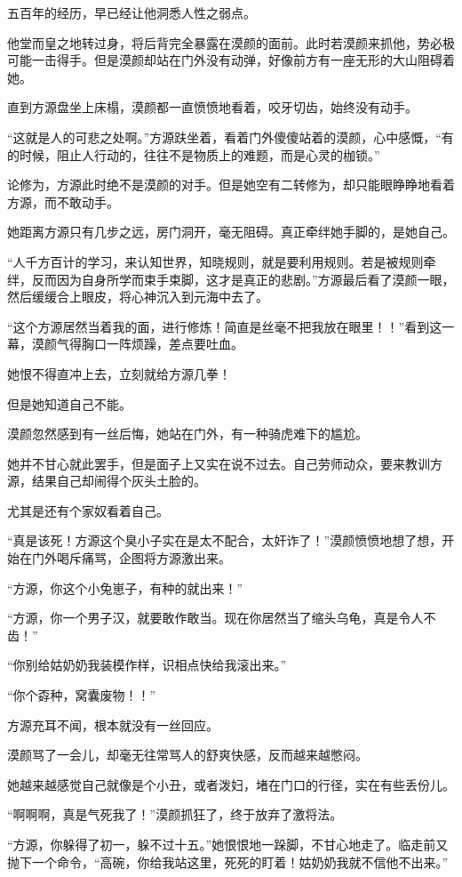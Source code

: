 \begin{this_body}
五百年的经历，早已经让他洞悉人性之弱点。

他堂而皇之地转过身，将后背完全暴露在漠颜的面前。此时若漠颜来抓他，势必极可能一击得手。但是漠颜却站在门外没有动弹，好像前方有一座无形的大山阻碍着她。

直到方源盘坐上床榻，漠颜都一直愤愤地看着，咬牙切齿，始终没有动手。

“这就是人的可悲之处啊。”方源趺坐着，看着门外傻傻站着的漠颜，心中感慨，“有的时候，阻止人行动的，往往不是物质上的难题，而是心灵的枷锁。”

论修为，方源此时绝不是漠颜的对手。但是她空有二转修为，却只能眼睁睁地看着方源，而不敢动手。

她距离方源只有几步之远，房门洞开，毫无阻碍。真正牵绊她手脚的，是她自己。

“人千方百计的学习，来认知世界，知晓规则，就是要利用规则。若是被规则牵绊，反而因为自身所学而束手束脚，这才是真正的悲剧。”方源最后看了漠颜一眼，然后缓缓合上眼皮，将心神沉入到元海中去了。

“这个方源居然当着我的面，进行修炼！简直是丝毫不把我放在眼里！！”看到这一幕，漠颜气得胸口一阵烦躁，差点要吐血。

她恨不得直冲上去，立刻就给方源几拳！

但是她知道自己不能。

漠颜忽然感到有一丝后悔，她站在门外，有一种骑虎难下的尴尬。

她并不甘心就此罢手，但是面子上又实在说不过去。自己劳师动众，要来教训方源，结果自己却闹得个灰头土脸的。

尤其是还有个家奴看着自己。

“真是该死！方源这个臭小子实在是太不配合，太奸诈了！”漠颜愤愤地想了想，开始在门外喝斥痛骂，企图将方源激出来。

“方源，你这个小兔崽子，有种的就出来！”

“方源，你一个男子汉，就要敢作敢当。现在你居然当了缩头乌龟，真是令人不齿！”

“你别给姑奶奶我装模作样，识相点快给我滚出来。”

“你个孬种，窝囊废物！！”

方源充耳不闻，根本就没有一丝回应。

漠颜骂了一会儿，却毫无往常骂人的舒爽快感，反而越来越憋闷。

她越来越感觉自己就像是个小丑，或者泼妇，堵在门口的行径，实在有些丢份儿。

“啊啊啊，真是气死我了！”漠颜抓狂了，终于放弃了激将法。

“方源，你躲得了初一，躲不过十五。”她恨恨地一跺脚，不甘心地走了。临走前又抛下一个命令，“高碗，你给我站这里，死死的盯着！姑奶奶我就不信他不出来。”


\end{this_body}

